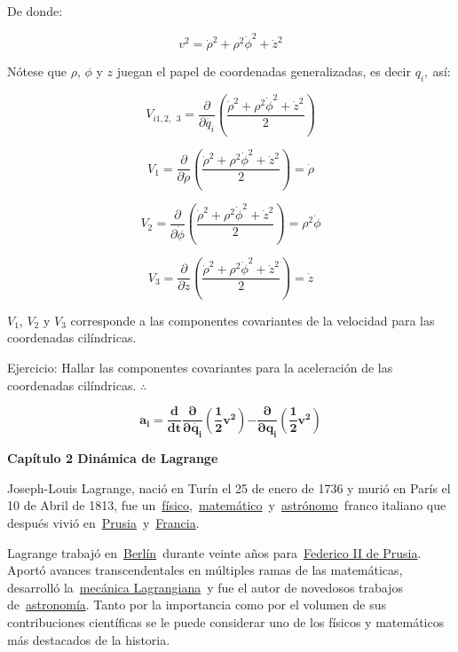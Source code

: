\documentclass[]{article}
\begin{document}
De donde:

\[v^{2} = {\dot{\rho}}^{2} + \rho^{2}{\dot{\phi}}^{2} + {\dot{z}}^{2}\]

Nótese que \(\rho\), \(\phi\) y \(z\) juegan el papel de coordenadas
generalizadas, es decir \(q_{i},\ \)así:

\[V_{i1,2,\ \ 3} = \frac{\partial}{\partial\dot{q_{i}}}\left( \frac{{\dot{\rho}}^{2} + \rho^{2}{\dot{\phi}}^{2} + {\dot{z}}^{2}}{2} \right)\]

\[V_{1} = \frac{\partial}{\partial\dot{\rho}}\left( \frac{{\dot{\rho}}^{2} + \rho^{2}{\dot{\phi}}^{2} + {\dot{z}}^{2}}{2} \right)\mathbf{=}\dot{\rho}\]

\[V_{2} = \frac{\partial}{\partial\dot{\phi}}\left( \frac{{\dot{\rho}}^{2} + \rho^{2}{\dot{\phi}}^{2} + {\dot{z}}^{2}}{2} \right) = \rho^{2}\dot{\phi}\]

\[V_{3} = \frac{\partial}{\partial\dot{z}}\left( \frac{{\dot{\rho}}^{2} + \rho^{2}{\dot{\phi}}^{2} + {\dot{z}}^{2}}{2} \right) = \dot{z}\]

\(V_{1}\), \(V_{2}\) y \(V_{3}\) corresponde a las componentes
covariantes de la velocidad para las coordenadas cilíndricas.

Ejercicio: Hallar las componentes covariantes para la aceleración de las
coordenadas cilíndricas. \(\therefore\)

\[\mathbf{a}_{\mathbf{i}}\mathbf{=}\frac{\mathbf{d}}{\mathbf{dt}}\frac{\mathbf{\partial}}{\mathbf{\partial}\dot{\mathbf{q}_{\mathbf{i}}}}\left( \frac{\mathbf{1}}{\mathbf{2}}\mathbf{v}^{\mathbf{2}} \right)\mathbf{-}\frac{\mathbf{\partial}}{\mathbf{\partial}\mathbf{q}_{\mathbf{i}}}\left( \frac{\mathbf{1}}{\mathbf{2}}\mathbf{v}^{\mathbf{2}} \right)\]

\textbf{Capítulo 2 Dinámica de Lagrange}

Joseph-Louis Lagrange, nació en Turín el 25 de enero de 1736 y murió en
París el 10 de Abril de 1813, fue
un~\href{https://es.wikipedia.org/wiki/F\%C3\%ADsico}{físico},~\href{https://es.wikipedia.org/wiki/Matem\%C3\%A1tico}{matemático}~y~\href{https://es.wikipedia.org/wiki/Astr\%C3\%B3nomo}{astrónomo}~franco
italiano que después vivió
en~\href{https://es.wikipedia.org/wiki/Prusia}{Prusia}~y~\href{https://es.wikipedia.org/wiki/Francia}{Francia}.

Lagrange trabajó
en~\href{https://es.wikipedia.org/wiki/Berl\%C3\%ADn}{Berlín}~durante
veinte años
para~\href{https://es.wikipedia.org/wiki/Federico_II_el_Grande}{Federico
II de Prusia}. Aportó avances transcendentales en múltiples ramas de las
matemáticas, desarrolló
la~\href{https://es.wikipedia.org/wiki/Mec\%C3\%A1nica_Lagrangiana}{mecánica
Lagrangiana}~y fue el autor de novedosos trabajos
de~\href{https://es.wikipedia.org/wiki/Astronom\%C3\%ADa}{astronomía}.
Tanto por la importancia como por el volumen de sus contribuciones
científicas se le puede considerar uno de los físicos y matemáticos más
destacados de la historia.
\end{document}
